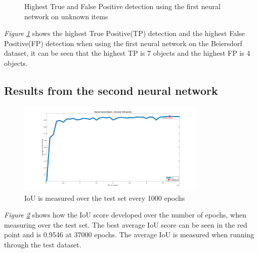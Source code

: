 \begin{figure}[h]
    \centering
    \hfill
    
    \caption{Highest True and False Positive detection using the first neural network on unknown items}
    \label{fig:v1max}
\end{figure}
\textit{Figure \ref{fig:v1max}} shows the highest True Positive(TP) detection and the highest False Positive(FP) detection when using the first neural network on the Beiersdorf dataset, it can be seen that the highest TP is 7 objects and the highest FP is 4 objects.
\clearpage

\subsection{Results from the second neural network}\label{sec:secondneural}
\begin{figure}[h]
    \centering
    \includegraphics[width=0.8\textwidth, trim={5cm 0 4cm 0},clip]{graphics/results/secondneuralnetworkauto.png}
    \caption{IoU is measured over the test set every 1000 epochs}
    \label{fig:v2neuralnetwork}
\end{figure}
\textit{Figure \ref{fig:v2neuralnetwork}} shows how the IoU score developed over the number of epochs, when measuring over the test set. The best average IoU score can be seen in the red point and is 0.9546 at 37000 epochs. The average IoU is measured when running through the test dataset.

